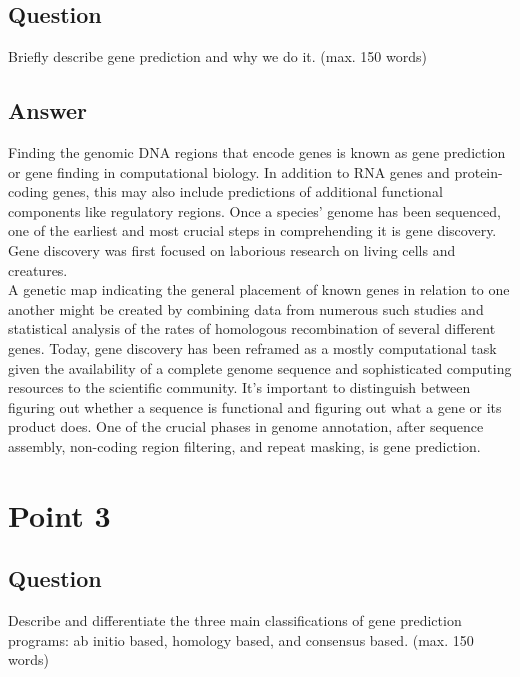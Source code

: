 \documentclass{article}
\begin{document}
\subsection*{Question}
Briefly describe gene prediction and why we do it. (max. 150 words)
\subsection*{Answer}
Finding the genomic DNA regions that encode genes is known as gene prediction or gene finding in computational biology. In addition to RNA genes and protein-coding genes, this may also include predictions of additional functional components like regulatory regions. Once a species' genome has been sequenced, one of the earliest and most crucial steps in comprehending it is gene discovery. 
Gene discovery was first focused on laborious research on living cells and creatures.\\
A genetic map indicating the general placement of known genes in relation to one another might be created by combining data from numerous such studies and statistical analysis of the rates of homologous recombination of several different genes. Today, gene discovery has been reframed as a mostly computational task given the availability of a complete genome sequence and sophisticated computing resources to the scientific community. 
It's important to distinguish between figuring out whether a sequence is functional and figuring out what a gene or its product does. 
One of the crucial phases in genome annotation, after sequence assembly, non-coding region filtering, and repeat masking, is gene prediction.
\section{Point 3}
\subsection*{Question}
Describe and differentiate the three main classifications of gene prediction
programs: ab initio based, homology based, and consensus based. (max. 150
words)
\end{document}
